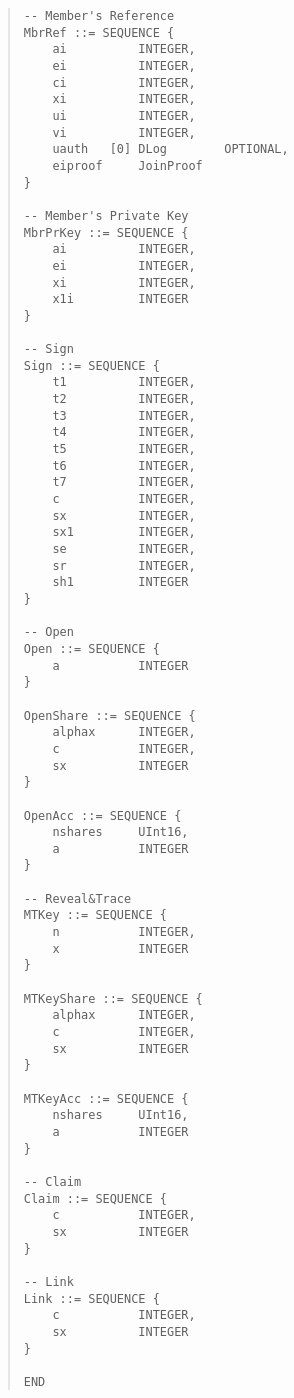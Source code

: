\documentclass[a4paper]{article}
\begin{document}
\begin{quote}
\begin{verbatim}
-- Member's Reference
MbrRef ::= SEQUENCE {
    ai          INTEGER,
    ei          INTEGER,
    ci          INTEGER,
    xi          INTEGER,
    ui          INTEGER,
    vi          INTEGER,
    uauth   [0] DLog        OPTIONAL,
    eiproof     JoinProof
}

-- Member's Private Key
MbrPrKey ::= SEQUENCE {
    ai          INTEGER,
    ei          INTEGER,
    xi          INTEGER,
    x1i         INTEGER
}

-- Sign
Sign ::= SEQUENCE {
    t1          INTEGER,
    t2          INTEGER,
    t3          INTEGER,
    t4          INTEGER,
    t5          INTEGER,
    t6          INTEGER,
    t7          INTEGER,
    c           INTEGER,
    sx          INTEGER,
    sx1         INTEGER,
    se          INTEGER,
    sr          INTEGER,
    sh1         INTEGER
}

-- Open
Open ::= SEQUENCE {
    a           INTEGER
}

OpenShare ::= SEQUENCE {
    alphax      INTEGER,
    c           INTEGER,
    sx          INTEGER
}

OpenAcc ::= SEQUENCE {
    nshares     UInt16,
    a           INTEGER
}

-- Reveal&Trace
MTKey ::= SEQUENCE {
    n           INTEGER,
    x           INTEGER
}

MTKeyShare ::= SEQUENCE {
    alphax      INTEGER,
    c           INTEGER,
    sx          INTEGER
}

MTKeyAcc ::= SEQUENCE {
    nshares     UInt16,
    a           INTEGER
}

-- Claim
Claim ::= SEQUENCE {
    c           INTEGER,
    sx          INTEGER
}

-- Link
Link ::= SEQUENCE {
    c           INTEGER,
    sx          INTEGER
}

END
\end{verbatim}
\end{quote}
\end{document}
